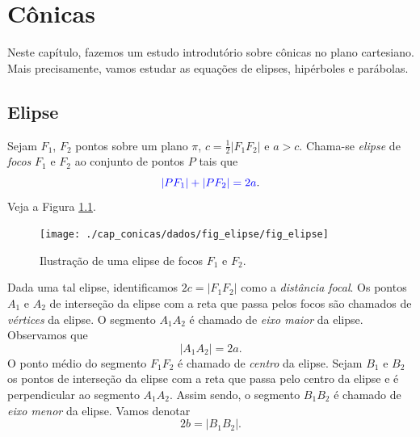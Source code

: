 
\chapter{Cônicas}\label{cap_conicas}
\thispagestyle{fancy}

Neste capítulo, fazemos um estudo introdutório sobre cônicas no plano cartesiano. Mais precisamente, vamos estudar as equações de elipses, hipérboles e parábolas.

\section{Elipse}\label{cap_conicas_sec_elipse}

Sejam $F_1$, $F_2$ pontos sobre um plano $\pi$, $c = \frac{1}{2}|F_1F_2|$ e $a > c$. Chama-se \emph{elipse} de \emph{focos} $F_1$ e $F_2$ ao conjunto de pontos $P$ tais que
\begin{equation}
  {\color{blue}|PF_1| + |PF_2| = 2a}.
\end{equation}
Veja a Figura \ref{fig:elipse}.

\begin{figure}[H]
  \centering
  \texttt{[image: ./cap\_conicas/dados/fig\_elipse/fig\_elipse]}
  \caption{Ilustração de uma elipse de focos $F_1$ e $F_2$.}
  \label{fig:elipse}
\end{figure}

Dada uma tal elipse, identificamos $2c=|F_1F_2|$ como a \emph{distância focal}. Os pontos $A_1$ e $A_2$ de interseção da elipse com a reta que passa pelos focos são chamados de \emph{vértices} da elipse. O segmento $A_1A_2$ é chamado de \emph{eixo maior} da elipse. Observamos que
\begin{equation}
  |A_1A_2| = 2a.
\end{equation}
O ponto médio do segmento $F_1F_2$ é chamado de \emph{centro} da elipse. Sejam $B_1$ e $B_2$ os pontos de interseção da elipse com a reta que passa pelo centro da elipse e é perpendicular ao segmento $A_1A_2$. Assim sendo, o segmento $B_1B_2$ é chamado de \emph{eixo menor} da elipse. Vamos denotar
\begin{equation}
  2b = |B_1B_2|.
\end{equation}

